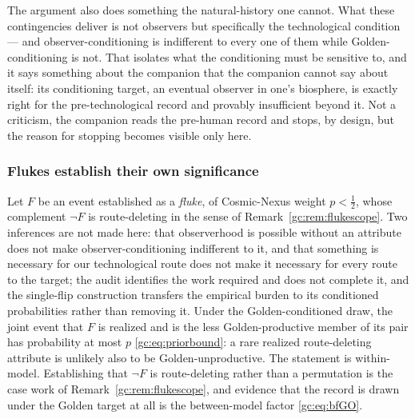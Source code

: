 The argument also does something the natural-history one cannot. What
these contingencies deliver is not observers but specifically the
technological condition --- and observer-conditioning is indifferent to
every one of them while Golden-conditioning is not. That isolates what
the conditioning must be sensitive to, and it says something about the
companion that the companion cannot say about itself: its
conditioning target, an eventual observer in one's biosphere, is exactly
right for the pre-technological record and provably insufficient beyond
it. Not a criticism, the companion reads the pre-human record and
stops, by design, but the reason for stopping becomes visible only
here.

\subsubsection{Flukes establish their own significance}
\label{gc:subsub:flukes}

\begin{proposition}
\label{gc:prop:flukes}
Let $F$ be an event established as a \emph{fluke}, of Cosmic-Nexus
weight $p<\tfrac12$, whose complement $\neg F$ is route-deleting in the
sense of Remark~\ref{gc:rem:flukescope}. Two inferences are not made here: that observerhood is possible without an attribute does not make observer-conditioning indifferent to it, and that something is necessary for our technological route does not make it necessary for every route to the target; the audit identifies the work required and does not complete it, and the single-flip construction transfers the empirical burden to its conditioned probabilities rather than removing it. Under the Golden-conditioned
draw, the joint event that $F$ is realized and is the less
Golden-productive member of its pair has probability at most $p$
\eqref{gc:eq:priorbound}: a rare realized route-deleting attribute is
unlikely also to be Golden-unproductive. The statement is within-model.
Establishing that $\neg F$ is route-deleting rather than a permutation
is the case work of Remark~\ref{gc:rem:flukescope}, and evidence that
the record is drawn under the Golden target at all is the between-model
factor \eqref{gc:eq:bfGO}.
\end{proposition}

